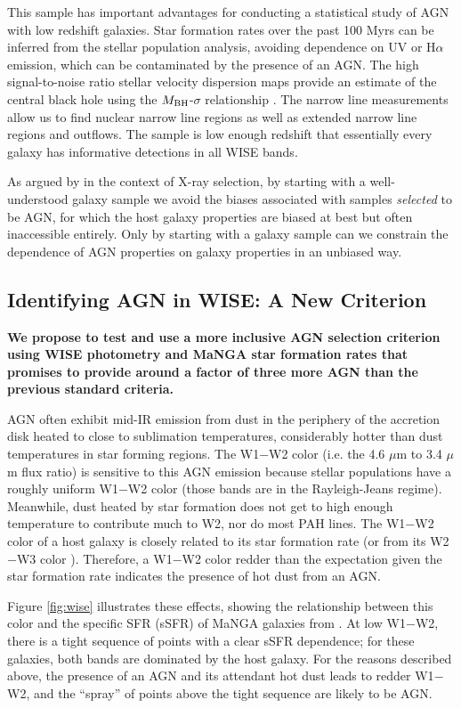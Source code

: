 \documentclass[12pt, preprint]{hacked-aastex}
\begin{document}
This sample has important advantages for conducting a statistical
study of AGN with low redshift galaxies.  Star formation rates over
the past 100 Myrs can be inferred from the stellar population
analysis, avoiding dependence on UV or H$\alpha$ emission, which can
be contaminated by the presence of an AGN. The high signal-to-noise
ratio stellar velocity dispersion maps provide an estimate of the
central black hole using the $M_{\rm BH}$-$\sigma$ relationship
\cite{kormendy04b}. The narrow line measurements allow us to find
nuclear narrow line regions as well as extended narrow line regions
and outflows. The sample is low enough redshift that essentially every
galaxy has informative detections in all WISE bands.

As argued by \cite{aird12a} in the context of X-ray selection, by
starting with a well-understood galaxy sample we avoid the biases
associated with samples {\it selected} to be AGN, for which the host
galaxy properties are biased at best but often inaccessible
entirely. Only by starting with a galaxy sample can we constrain the
dependence of AGN properties on galaxy properties in an unbiased way.

\subsection{Identifying AGN in WISE: A New Criterion}
\label{sec:criterion}

{\bf We propose to test and use a more inclusive AGN selection
  criterion using WISE photometry and MaNGA star formation rates that
  promises to provide around a factor of three more AGN than the
  previous standard criteria.}

AGN often exhibit mid-IR emission from dust in the periphery of the
accretion disk heated to close to sublimation temperatures,
considerably hotter than dust temperatures in star forming regions.
The W1$-$W2 color (i.e. the 4.6 $\mu$m to 3.4 $\mu$m flux ratio) is
sensitive to this AGN emission because stellar populations have a
roughly uniform W1$-$W2 color (those bands are in the Rayleigh-Jeans
regime).  Meanwhile, dust heated by star formation does not get to
high enough temperature to contribute much to W2, nor do most PAH
lines.  The W1$-$W2 color of a host galaxy is closely related to its
star formation rate (or from its W2$-$W3 color \cite{hviding22a}).
Therefore, a W1$-$W2 color redder than the expectation given the star
formation rate indicates the presence of hot dust from an AGN.

Figure \ref{fig:wise} illustrates these effects, showing the
relationship between this color and the specific SFR (sSFR) of MaNGA
galaxies from \cite{sanchez22a}.  At low W1$-$W2, there is a tight
sequence of points with a clear sSFR dependence; for these galaxies,
both bands are dominated by the host galaxy.  For the reasons
described above, the presence of an AGN and its attendant hot dust
leads to redder W1$-$W2, and the ``spray'' of points above the tight
sequence are likely to be AGN.
\end{document}
